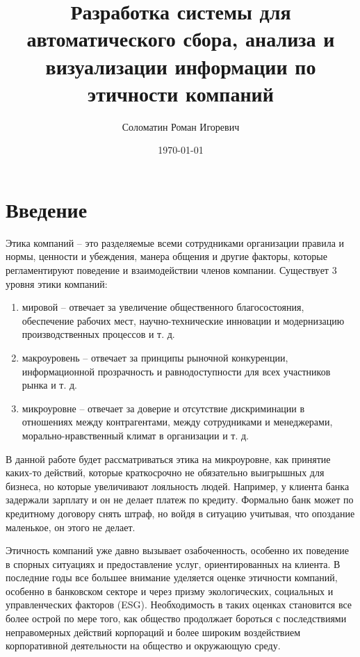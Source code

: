 \documentclass[PI, VKR]{HSEUniversity}
\author{Соломатин Роман Игоревич}
\date{\today}
\title{Разработка системы для автоматического сбора, анализа и визуализации информации по этичности компаний}
\begin{document}
\maketitle

\chapter*{Введение}
\label{sec:org63b126b}
Этика компаний – это разделяемые всеми сотрудниками организации правила и нормы, ценности и убеждения, манера общения и другие факторы, которые регламентируют поведение и взаимодействии членов компании. Существует 3 уровня этики компаний\autocite{smirnova_biznesetika_2021}:
\begin{enumerate}
\item мировой -- отвечает за увеличение общественного благосостояния, обеспечение рабочих мест, научно-технические инновации и модернизацию производственных процессов и т. д.
\item макроуровень -- отвечает за принципы рыночной конкуренции, информационной прозрачность и равнодоступности для всех участников рынка и т. д.
\item микроуровне -- отвечает за доверие и отсутствие дискриминации в отношениях между контрагентами, между сотрудниками и менеджерами, морально-нравственный климат в организации и т. д.
\end{enumerate}

В данной работе будет рассматриваться этика на микроуровне, как принятие каких-то действий, которые краткосрочно не обязательно выигрышных для бизнеса, но которые увеличивают лояльность людей. Например, у клиента банка задержали зарплату и он не делает платеж по кредиту. Формально банк может по кредитному договору снять штраф, но войдя в ситуацию учитывая, что опоздание маленькое, он этого не делает.

Этичность компаний уже давно вызывает озабоченность, особенно их поведение в спорных ситуациях и предоставление услуг, ориентированных на клиента. В последние годы все большее внимание уделяется оценке этичности компаний\autocites{mure_esg_2021}[][]{semenko_korporativnaya_2022}[][]{kudryavceva_korporativnosocialnaya_2016}, особенно в банковском секторе и через призму экологических, социальных и управленческих факторов (ESG). Необходимость в таких оценках становится все более острой по мере того, как общество продолжает бороться с последствиями неправомерных действий корпораций и более широким воздействием корпоративной деятельности на общество и окружающую среду.
\end{document}
